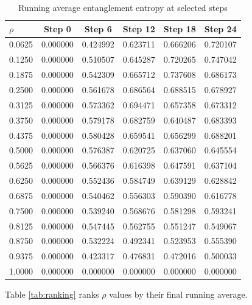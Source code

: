 \documentclass[11pt,a4paper]{article}
\begin{document}
\begin{table}[H]
\centering
\caption{Running average entanglement entropy at selected steps}
\label{tab:running_avg_key}
\begin{tabular}{lccccc}
\toprule
$\rho$ & Step 0 & Step 6 & Step 12 & Step 18 & Step 24 \\
\midrule
0.0625 & 0.000000 & 0.424992 & 0.623711 & 0.666206 & 0.720107 \\
0.1250 & 0.000000 & 0.510507 & 0.645287 & 0.720265 & 0.747042 \\
0.1875 & 0.000000 & 0.542309 & 0.665712 & 0.737608 & 0.686173 \\
0.2500 & 0.000000 & 0.561678 & 0.686564 & 0.688515 & 0.678927 \\
0.3125 & 0.000000 & 0.573362 & 0.694471 & 0.657358 & 0.673312 \\
0.3750 & 0.000000 & 0.579178 & 0.682759 & 0.640487 & 0.683393 \\
0.4375 & 0.000000 & 0.580428 & 0.659541 & 0.656299 & 0.688201 \\
0.5000 & 0.000000 & 0.576387 & 0.620725 & 0.637060 & 0.645554 \\
0.5625 & 0.000000 & 0.566376 & 0.616398 & 0.647591 & 0.637104 \\
0.6250 & 0.000000 & 0.552436 & 0.584749 & 0.639129 & 0.628842 \\
0.6875 & 0.000000 & 0.540462 & 0.556303 & 0.590390 & 0.616778 \\
0.7500 & 0.000000 & 0.539240 & 0.568676 & 0.581298 & 0.593241 \\
0.8125 & 0.000000 & 0.547445 & 0.562755 & 0.551247 & 0.549067 \\
0.8750 & 0.000000 & 0.532224 & 0.492341 & 0.523953 & 0.555390 \\
0.9375 & 0.000000 & 0.423317 & 0.476831 & 0.472016 & 0.500033 \\
1.0000 & 0.000000 & 0.000000 & 0.000000 & 0.000000 & 0.000000 \\
\bottomrule
\end{tabular}
\end{table}

Table \ref{tab:ranking} ranks $\rho$ values by their final running average.
\end{document}
